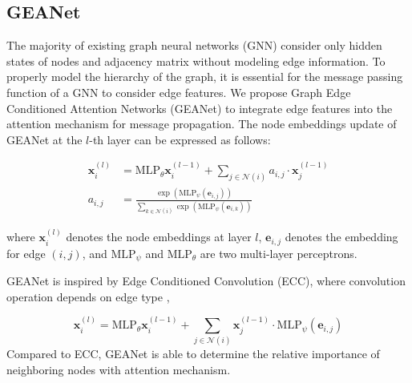 \documentclass[11pt,a4paper]{article}
\newcommand{\GAENet}{\textrm{GEANet}}
\begin{document}
\subsection{\GAENet}
The majority of existing graph neural networks (GNN) consider only hidden states of nodes and adjacency matrix without modeling edge information. To properly model the hierarchy of the graph, it is essential for the message passing function of a GNN to consider edge features. We propose Graph Edge Conditioned Attention Networks (\GAENet) to integrate edge features into the attention mechanism for message propagation. The node embeddings update of \GAENet{} at the $l$-th layer can be expressed as follows:

{\small
\begin{align}
  \bm{x}^{(l)}_{i} &= \textrm{MLP}_{\theta} \bm{x}^{(l-1)}_{i} + \sum_{j \in \mathcal{N}(i)} a_{i,j} \cdot \bm{x}^{(l-1)}_{j}\\
  a_{i,j} &=
        \frac{
        \exp\left( \textrm{MLP}_{\psi}( \bm{e}_{i,j} )
        \right)}
        {\sum_{k \in \mathcal{N}(i) }
        \exp\left( \textrm{MLP}_{\psi}( \bm{e}_{i,k} )
        \right)}
\end{align}}

where $\bm{x}^{(l)}_{i}$ denotes the node embeddings at layer $l$, $\bm{e}_{i,j}$ denotes the embedding for edge $(i, j)$, and $\textrm{MLP}_{\psi}$ and $\textrm{MLP}_{\theta}$ are two multi-layer perceptrons.

\GAENet{} is inspired by Edge Conditioned Convolution (ECC), where convolution operation depends on edge type \cite{simonovsky2017dynamic},

{\small
\begin{equation}
  \bm{x}^{(l)}_{i} = \textrm{MLP}_{\theta} \bm{x}^{(l-1)}_{i} + \sum_{j \in \mathcal{N}(i)}  \bm{x}^{(l-1)}_{j} \cdot \textrm{MLP}_{\psi}(\bm{e}_{i,j})
\end{equation}
}
Compared to ECC, \GAENet{} is able to determine the relative importance of neighboring nodes with attention mechanism.
\end{document}
